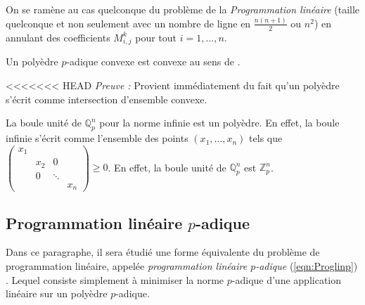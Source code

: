 \begin{definition}
\begin{remarque}
	On se ramène au cas quelconque du problème de la \textit{Programmation linéaire} (taille quelconque et non seulement avec un nombre de ligne en $\frac{n(n+1)}{2}$ ou $n^2$) en annulant des coefficients $M^k_{i,j}$ pour tout $i=1,\ldots,n$.   
\end{remarque}

\begin{propriete}
Un polyèdre $p$-adique convexe est convexe au sens de \cite{monna_ensembles_1958}.  
\end{propriete}

<<<<<<< HEAD
\textit{Preuve :} Provient immédiatement du fait qu'un polyèdre s'écrit comme intersection d'ensemble convexe.
\fi
\begin{ex}
	La boule unité de $\mathbb{Q}_{p}^n$ pour la norme infinie est un polyèdre. En effet, la boule infinie s'écrit comme l'ensemble des points $\left( x_1,\ldots,x_n \right)$ tels que $
	\begin{pmatrix} x_1 &  & & \\
		  & x_2 &0 &  \\
		&  0& \ddots & \\
		&  & & x_n
	\end{pmatrix} \ge 0$. En effet, la boule unité de $\mathbb{Q}_{p} ^n$ est $\mathbb{Z}_p^n$. %

\end{ex}

\subsection{Programmation linéaire \texorpdfstring{$p$-adique}{p-adique} } 
\label{sectionalgo} 
Dans ce paragraphe, il sera étudié une forme équivalente du problème de programmation linéaire, appelée \textit{programmation linéaire $p$-adique} (\ref{eqn:Proglinp}) . Lequel consiste simplement à minimiser la norme $p$-adique d'une application linéaire sur un polyèdre $p$-adique. 


\end{definition}
